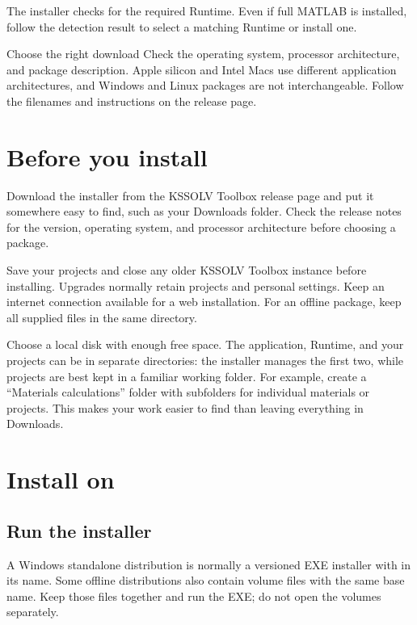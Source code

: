 The installer checks for the required Runtime. Even if full MATLAB\regmark{} is installed, follow the detection result to select a matching Runtime or install one.

\begin{notebox}{Choose the right download}
Check the operating system, processor architecture, and package description. Apple silicon and Intel Macs use different application architectures, and Windows and Linux packages are not interchangeable. Follow the filenames and instructions on the release page.
\end{notebox}

\section{Before you install}

Download the installer from the KSSOLV Toolbox release page and put it somewhere easy to find, such as your Downloads folder. Check the release notes for the version, operating system, and processor architecture before choosing a package.

Save your projects and close any older KSSOLV Toolbox instance before installing. Upgrades normally retain projects and personal settings. Keep an internet connection available for a web installation. For an offline package, keep all supplied files in the same directory.

Choose a local disk with enough free space. The application, Runtime, and your projects can be in separate directories: the installer manages the first two, while projects are best kept in a familiar working folder. For example, create a ``Materials calculations'' folder with subfolders for individual materials or projects. This makes your work easier to find than leaving everything in Downloads.

\section{Install on }

\subsection{Run the installer}

A Windows standalone distribution is normally a versioned EXE installer with  in its name. Some offline distributions also contain  volume files with the same base name. Keep those files together and run the EXE; do not open the volumes separately.

